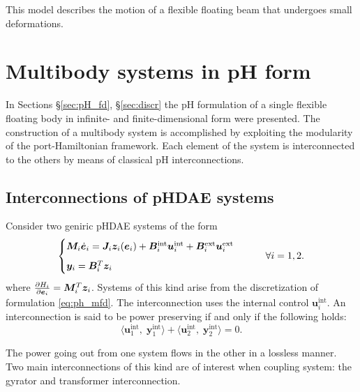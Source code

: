 \documentclass{svjour3}                     %
\newcommand{\secref}[1]{\S\ref{#1}}
\begin{document}
This model describes the motion of a flexible floating beam that undergoes small deformations. 

\section{Multibody systems in pH form}
In Sections \secref{sec:pH_fd}, \secref{sec:discr} the pH formulation of a single flexible floating body in infinite- and finite-dimensional form were presented. The construction of a multibody system is accomplished by exploiting the modularity of the port-Hamiltonian framework. Each element of the system is interconnected to the others by means of classical pH interconnections.

\subsection{Interconnections of pHDAE systems}
Consider two geniric pHDAE systems of the form
\begin{equation}
\begin{cases}
\bm{M}_i \dot{\bm{e}}_i = \bm{J}_i \bm{z}_i(\bm{e}_i) + \bm{B}_i^{\text{int}} \bm{u}_i^{\text{int}} + \bm{B}_i^{\text{ext}} \bm{u}_i^{\text{ext}}  \vspace{2mm} \\
\bm{y}_i = \bm{B}_i^T  \bm{z}_i
\end{cases} \qquad \forall i = 1, 2.
\end{equation}
where $\diffp{H_i}{\bm{e}_i} = \bm{M}_i^T \bm{z}_i$. Systems of this kind arise from the discretization of formulation \eqref{eq:ph_mfd}. The interconnection uses the internal control $\bm{u}_i^{\text{int}}$. An interconnection is said to be power preserving if and only if the following holds:
\begin{equation} \label{eq:int_balance}
\langle \bm{u}_1^{\text{int}}, \; \bm{y}_1^{\text{int}} \rangle + \langle \bm{u}_2^{\text{int}}, \; \bm{y}_2^{\text{int}} \rangle = 0.
\end{equation}

The power going out from one system flows in the other in a lossless manner. Two main interconnections of this kind are of interest when coupling system: the gyrator and transformer interconnection.
\end{document}

